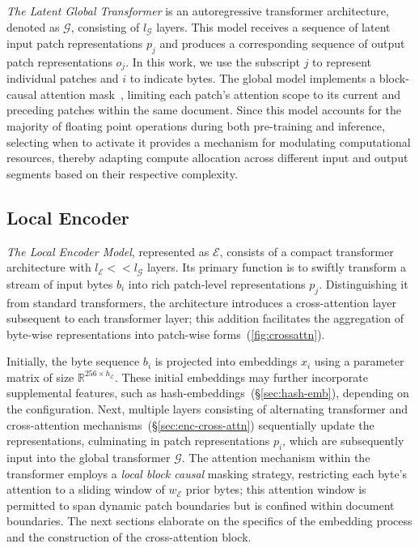 \textit{The Latent Global Transformer} is an autoregressive transformer architecture, denoted as $\mathcal{G}$, consisting of $l_{\mathcal{G}}$ layers. This model receives a sequence of latent input patch representations $p_j$ and produces a corresponding sequence of output patch representations $o_j$. In this work, we use the subscript $j$ to represent individual patches and $i$ to indicate bytes. The global model implements a block-causal attention mask~\citep{dubey2024llama}, limiting each patch’s attention scope to its current and preceding patches within the same document. Since this model accounts for the majority of floating point operations during both pre-training and inference, selecting when to activate it provides a mechanism for modulating computational resources, thereby adapting compute allocation across different input and output segments based on their respective complexity.

\subsection{Local Encoder}
\label{section:local}

\textit{The Local Encoder Model}, represented as $\mathcal{E}$, consists of a compact transformer architecture with $l_{\mathcal{E}} << l_{\mathcal{G}}$ layers. Its primary function is to swiftly transform a stream of input bytes $b_i$ into rich patch-level representations $p_j$. Distinguishing it from standard transformers, the architecture introduces a cross-attention layer subsequent to each transformer layer; this addition facilitates the aggregation of byte-wise representations into patch-wise forms~(\autoref{fig:crossattn}).

Initially, the byte sequence $b_i$ is projected into embeddings $x_i$ using a parameter matrix of size $\mathbb{R}^{256 \times h_{\mathcal{E}}}$. These initial embeddings may further incorporate supplemental features, such as hash-embeddings~(\S\ref{sec:hash-emb}), depending on the configuration. Next, multiple layers consisting of alternating transformer and cross-attention mechanisms~(\S\ref{sec:enc-cross-attn}) sequentially update the representations, culminating in patch representations $p_i$, which are subsequently input into the global transformer $\mathcal{G}$. The attention mechanism within the transformer employs a \textit{local block causal} masking strategy, restricting each byte’s attention to a sliding window of $w_{\mathcal{E}}$ prior bytes; this attention window is permitted to span dynamic patch boundaries but is confined within document boundaries. The next sections elaborate on the specifics of the embedding process and the construction of the cross-attention block.

